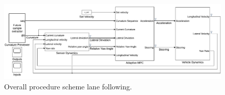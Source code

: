 \begin{figure}[!h]
	\centering
	\includegraphics[width=\textwidth]{../figure/lane_following_AMPC.pdf}
	\caption{Overall procedure scheme lane following.}
	\label{fig:scheme_lane_following}
\end{figure}


